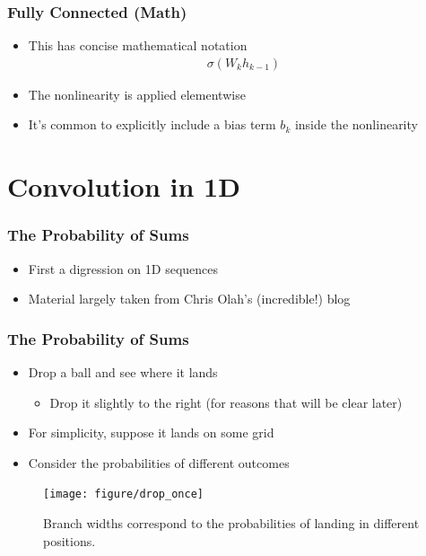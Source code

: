 \documentclass[10pt,mathserif]{beamer}
\begin{document}
\begin{frame}
  \frametitle{Fully Connected (Math)}
  \begin{itemize}
  \item This has concise mathematical notation
    \begin{align*}
      \sigma\left(W_{k}h_{k - 1}\right)
    \end{align*}
  \item The nonlinearity is applied elementwise
  \item It's common to explicitly include a bias term $b_{k}$ inside the
    nonlinearity
  \end{itemize}
\end{frame}

\section{Convolution in 1D}

\begin{frame}
  \frametitle{The Probability of Sums}
  \begin{itemize}
  \item First a digression on 1D sequences
  \item Material largely taken from Chris Olah's (incredible!) blog
  \end{itemize}
\end{frame}

\begin{frame}
  \frametitle{The Probability of Sums}
  \begin{itemize}
  \item Drop a ball and see where it lands
    \begin{itemize}
    \item Drop it slightly to the right (for reasons that will be clear later)
    \end{itemize}
  \item For simplicity, suppose it lands on some grid
  \item Consider the probabilities of different outcomes
  \end{itemize}
\begin{figure}[ht]
  \centering
  \texttt{[image: figure/drop\_once]}
  \caption{Branch widths correspond to the probabilities of landing in different
    positions. \label{fig:drop_once} }
\end{figure}
\end{frame}
\end{document}

